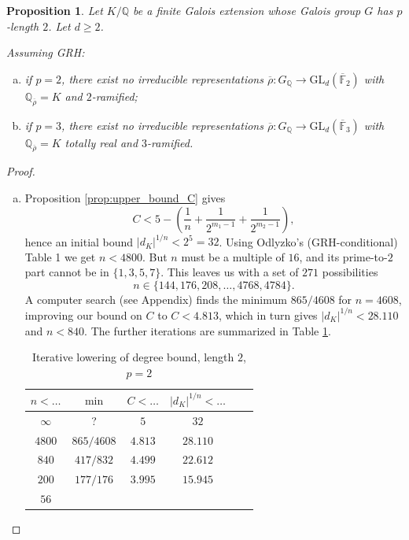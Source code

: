 \documentclass{amsart}
\newtheorem{prop}[theorem]{Proposition}
\theoremstyle{definition}
\newcommand{\lra}{\longrightarrow}
\newcommand{\Q}{\mathbb{Q}}
\newcommand{\F}{\mathbb{F}}
\newcommand{\bF}{\overline{\F}}
\newcommand{\br}{\overline{\rho}}
\newcommand{\GL}{\mathrm{GL}}
\renewcommand{\geq}{\geqslant}
\begin{document}
\begin{prop}\label{prop:length2}
  Let $K/\Q$ be a finite Galois extension whose Galois group $G$ has $p$-length $2$.
  Let $d\geq 2$.

  Assuming GRH:
  \begin{enumerate}[(a)]
    \item if $p=2$, there exist no irreducible representations $\br:G_\Q\lra\GL_d(\bF_2)$ with $\Q_{\br}=K$ and $2$-ramified;
    \item if $p=3$, there exist no irreducible representations $\br:G_\Q\lra\GL_d(\bF_3)$ with $\Q_{\br}=K$ totally real and $3$-ramified.
  \end{enumerate}
\end{prop}
\begin{proof}
  \begin{enumerate}[(a)]
    \item Proposition \ref{prop:upper_bound_C} gives
      \begin{equation*}
        C < 5 - \left(\frac{1}{n}+\frac{1}{2^{m_1-1}}+\frac{1}{2^{m_2-1}}\right),
      \end{equation*}
      hence an initial bound $|d_K|^{1/n}<2^5=32$.
      Using Odlyzko's (GRH-conditional) Table 1 we get $n<4800$.
      But $n$ must be a multiple of $16$, and its prime-to-$2$ part cannot be in $\{1,3,5,7\}$.
      This leaves us with a set of $271$ possibilities
      \begin{equation*}
        n\in\{144,176,208,\dots,4768,4784\}.
      \end{equation*}
      A computer search (see Appendix) finds the minimum $865/4608$ for $n=4608$, improving our bound on $C$ to $C<4.813$, which in turn gives $|d_K|^{1/n}<28.110$ and $n<840$.
      The further iterations are summarized in Table \ref{tab_length2_p2}.

      \begin{table}[h]
        \begin{tabular}{cccccl}
          \toprule
          $n<\dots$ & $\min$     & $C<\dots$ & $|d_K|^{1/n}<\dots$ \\ \midrule
          $\infty$  & ?          & $5$       & $32$                \\
          $4800$    & $865/4608$ & $4.813$   & $28.110$            \\
          $840$     & $417/832$  & $4.499$   & $22.612$            \\
          $200$     & $177/176$  & $3.995$   & $15.945$            \\
          $56$                                                     \\
          \bottomrule
        \end{tabular}
        \caption{Iterative lowering of degree bound, length $2$, $p=2$}
        \label{tab_length2_p2}
      \end{table}


\end{enumerate}
\end{proof}
\end{document}
